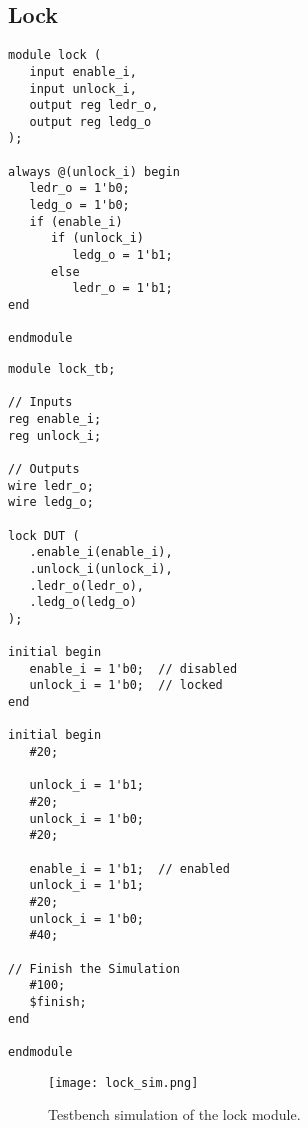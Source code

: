 \subsection{Lock}

\begin{verbatim}
module lock (
   input enable_i,
   input unlock_i,
   output reg ledr_o,
   output reg ledg_o
);

always @(unlock_i) begin
   ledr_o = 1'b0;
   ledg_o = 1'b0;
   if (enable_i)
      if (unlock_i)
         ledg_o = 1'b1;
      else
         ledr_o = 1'b1;
end

endmodule
\end{verbatim}

\begin{verbatim}
module lock_tb;

// Inputs
reg enable_i;
reg unlock_i;

// Outputs
wire ledr_o;
wire ledg_o;

lock DUT (
   .enable_i(enable_i),
   .unlock_i(unlock_i),
   .ledr_o(ledr_o),
   .ledg_o(ledg_o)
);

initial begin
   enable_i = 1'b0;  // disabled
   unlock_i = 1'b0;  // locked
end

initial begin
   #20;

   unlock_i = 1'b1;
   #20;
   unlock_i = 1'b0;
   #20;

   enable_i = 1'b1;  // enabled
   unlock_i = 1'b1;
   #20;
   unlock_i = 1'b0;
   #40;

// Finish the Simulation
   #100;
   $finish;
end

endmodule
\end{verbatim}

\begin{figure}[htbp]
   \centering
   \texttt{[image: lock\_sim.png]}
   \caption{Testbench simulation of the lock module.}
   \label{fig:lock_sim}
\end{figure}

